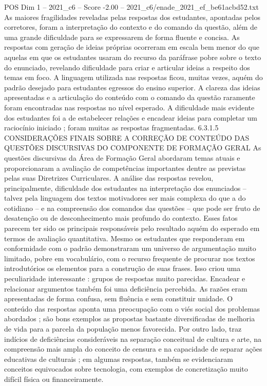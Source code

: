 \begin{textsample}{POS Dim 1 – 2021\_c6 – Score -2.00 – 2021\_c6/enade\_2021\_ef\_be61acbd52.txt}
As maiores fragilidades reveladas pelas respostas dos estudantes, apontadas pelos corretores, foram a interpretação do contexto e do comando da questão, além de uma grande dificuldade para se expressarem de forma fluente e concisa.
As respostas com geração de ideias próprias ocorreram em escala bem menor do que aquelas em que os estudantes usaram do recurso da paráfrase pobre sobre o texto do enunciado, revelando dificuldade para criar e articular ideias a respeito dos temas em foco.
A linguagem utilizada nas respostas ficou, muitas vezes, aquém do padrão desejado para estudantes egressos do ensino superior.
A clareza das ideias apresentadas e a articulação do conteúdo com o comando da questão raramente foram encontradas nas respostas no nível esperado.
A dificuldade mais evidente dos estudantes foi a de estabelecer relações e encadear ideias para completar um raciocínio iniciado ; foram muitas as respostas fragmentadas. 6.3.1.5 CONSIDERAÇÕES FINAIS SOBRE A CORREÇÃO DE CONTEÚDO DAS QUESTÕES DISCURSIVAS DO COMPONENTE DE FORMAÇÃO GERAL As questões discursivas da Área de Formação Geral abordaram temas atuais e proporcionaram a avaliação de competências importantes dentre as previstas pelas suas Diretrizes Curriculares.
A análise das respostas revelou, principalmente, dificuldade dos estudantes na interpretação dos enunciados – talvez pela linguagem dos textos motivadores ser mais complexa do que a do cotidiano – e na compreensão dos comandos das questões – que pode ser fruto de desatenção ou de desconhecimento mais profundo do contexto.
Esses fatos parecem ter sido os principais responsáveis pelo resultado aquém do esperado em termos de avaliação quantitativa.
Mesmo os estudantes que responderam em conformidade com o padrão demonstraram um universo de argumentação muito limitado, pobre em vocabulário, com o recurso frequente de procurar nos textos introdutórios os elementos para a construção de suas frases.
Isso criou uma peculiaridade interessante : grupos de respostas muito parecidas.
Encadear e relacionar argumentos também foi uma deficiência percebida.
As razões eram apresentadas de forma confusa, sem fluência e sem constituir unidade.
O conteúdo das respostas aponta uma preocupação com o viés social dos problemas abordados ; são bons exemplos as propostas bastante diversificadas de melhoria de vida para a parcela da população menos favorecida.
Por outro lado, traz indícios de deficiências consideráveis na separação conceitual de cultura e arte, na compreensão mais ampla do conceito de censura e na capacidade de separar ações educativas de culturais ; em algumas respostas, também se evidenciaram conceitos equivocados sobre tecnologia, com exemplos de concretização muito difícil física ou financeiramente.

\end{textsample}
